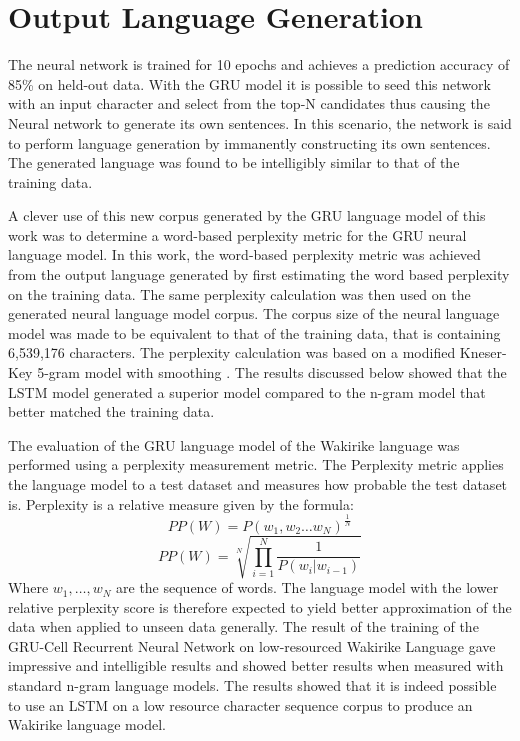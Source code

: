 \section{Output Language Generation}
The neural network is trained for 10 epochs and achieves a prediction accuracy of 85\% on held-out data.  With the GRU model it is possible to seed this network with an input character and select from the top-N candidates thus causing the Neural network to generate its own sentences.  In this scenario, the network is said to perform language generation by immanently constructing its own sentences.  The generated language was found to be intelligibly similar to that of the training data. 

A clever use of this new corpus generated by the GRU language model of this work was to determine a word-based perplexity metric for the GRU neural language model. In this work, the word-based perplexity metric was achieved from the output language generated by first estimating the word based perplexity on the training data.  The same perplexity calculation was then used on the generated neural language model corpus. The corpus size of the neural language model was made to be equivalent to that of the training data, that is containing 6,539,176 characters.  The perplexity calculation was based on a modified Kneser-Key 5-gram model with smoothing \citep{Heafield-estimate}.  The results discussed below showed that the LSTM model generated a superior model compared to the n-gram model that better matched the training data.

The evaluation of the GRU language model of the Wakirike language was performed using a perplexity measurement metric. The Perplexity metric applies the language model to a test dataset and measures how probable the test dataset is. Perplexity is a relative measure given by the formula:
%
\begin{equation}
PP(W)=P(w_1,w_2\dots w_N)^\frac{1}{N}
\label{ch5_eq1_ppx}
\end{equation}
%
%
\begin{equation}
PP(W)=\sqrt[N]{\prod_{i=1}^N\frac{1}{P(w_i|w_{i-1})}}
\label{ch5_eq2_ppx}
\end{equation}
%
Where $w_1,\dots,w_N$ are the sequence of words. The language model with the lower relative perplexity score is therefore expected to yield better approximation of the data when applied to unseen data generally.
The result of the training of the GRU-Cell Recurrent Neural Network on low-resourced Wakirike Language gave impressive and intelligible results and showed better results when measured with standard n-gram language models. The results showed that it is indeed possible to use an LSTM on a low resource character sequence corpus to produce an Wakirike language model.

